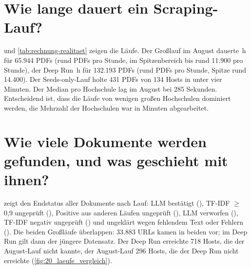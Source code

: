 
\section{Wie lange dauert ein Scraping-Lauf?}
 und \cref{tab:rechnung-realitaet} zeigen die Läufe. Der Großlauf im August dauerte \zDauerAug{}\,h für 65.944 PDFs (rund \zRateAug{} PDFs pro Stunde, im Spitzenbereich bis rund 11.900 pro Stunde), der Deep Run \zDauerDeep{}\,h für 132.193 PDFs (rund \zRateDeep{} PDFs pro Stunde, Spitze rund 14.400). Der Seeds-only-Lauf holte 431 PDFs von 134 Hosts in unter vier Minuten. Der Median pro Hochschule lag im August bei 285 Sekunden. Entscheidend ist, dass die Läufe von wenigen großen Hochschulen dominiert werden, die Mehrzahl der Hochschulen war in Minuten abgearbeitet.


\section{Wie viele Dokumente werden gefunden, und was geschieht mit ihnen?}
 zeigt den Endstatus aller \zDocsTotal{} Dokumente nach Lauf: LLM bestätigt (\zLLMConfirmed), TF-IDF $\ge$ 0,9 ungeprüft (\zTfidfHigh), Positive aus anderen Läufen ungeprüft (\zTfidfOther), LLM verworfen (\zLLMRejected), TF-IDF negativ ungeprüft (\zTfidfNegative) und ungeklärt wegen fehlendem Text oder Fehlern (\zUnresolved). Die beiden Großläufe überlappen: 33.883 URLs kamen in beiden vor; im Deep Run gilt dann der jüngere Datensatz. Der Deep Run erreichte 718 Hosts, die der August-Lauf nicht kannte, der August-Lauf 296 Hosts, die der Deep Run nicht erreichte (\cref{fig:20_laeufe_vergleich}).


